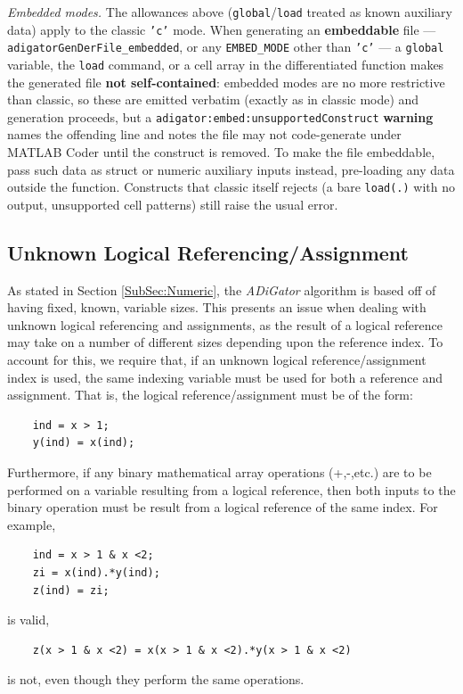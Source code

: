 \documentclass[10pt,pdftex]{article}
\begin{document}
\emph{Embedded modes.} The allowances above (\texttt{global}/\texttt{load} treated as known auxiliary data) apply to the classic \texttt{'c'} mode. When generating an {\bf embeddable} file --- \texttt{adigatorGenDerFile\_embedded}, or any \texttt{EMBED\_MODE} other than \texttt{'c'} --- a \texttt{global} variable, the \texttt{load} command, or a cell array in the differentiated function makes the generated file {\bf not self-contained}: embedded modes are no more restrictive than classic, so these are emitted verbatim (exactly as in classic mode) and generation proceeds, but a \texttt{adigator:embed:unsupportedConstruct} {\bf warning} names the offending line and notes the file may not code-generate under MATLAB Coder until the construct is removed. To make the file embeddable, pass such data as struct or numeric auxiliary inputs instead, pre-loading any data outside the function. Constructs that classic itself rejects (a bare \texttt{load(.)} with no output, unsupported cell patterns) still raise the usual error.

\subsection{Unknown Logical Referencing/Assignment}\label{SubSec:Logical}
As stated in Section \ref{SubSec:Numeric}, the \emph{ADiGator} algorithm is based off of having fixed, known, variable sizes. This presents an issue when dealing with unknown logical referencing and assignments, as the result of a logical reference may take on a number of different sizes depending upon the reference index. To account for this, we require that, if an unknown logical reference/assignment index is used, the same indexing variable must be used for both a reference and assignment. That is, the logical reference/assignment must be of the form:
\begin{verbatim}
    ind = x > 1;
    y(ind) = x(ind);
\end{verbatim}
Furthermore, if any binary mathematical array operations (+,-,etc.) are to be performed on a variable resulting from a logical reference, then both inputs to the binary operation must be result from a logical reference of the same index. For example,
\begin{verbatim}
    ind = x > 1 & x <2;
    zi = x(ind).*y(ind);
    z(ind) = zi;
\end{verbatim}
is valid,
\begin{verbatim}
    z(x > 1 & x <2) = x(x > 1 & x <2).*y(x > 1 & x <2)
\end{verbatim}
is not, even though they perform the same operations.
\end{document}
